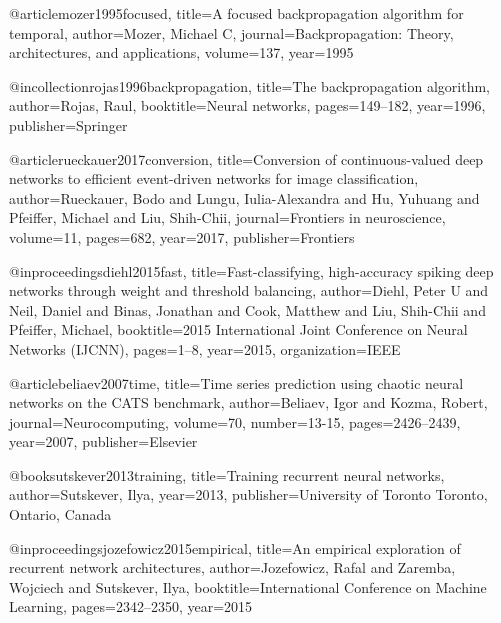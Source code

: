 @article{mozer1995focused,
  title={A focused backpropagation algorithm for temporal},
  author={Mozer, Michael C},
  journal={Backpropagation: Theory, architectures, and applications},
  volume={137},
  year={1995}
}

@incollection{rojas1996backpropagation,
  title={The backpropagation algorithm},
  author={Rojas, Raul},
  booktitle={Neural networks},
  pages={149--182},
  year={1996},
  publisher={Springer}
}

@article{rueckauer2017conversion,
  title={Conversion of continuous-valued deep networks to efficient event-driven networks for image classification},
  author={Rueckauer, Bodo and Lungu, Iulia-Alexandra and Hu, Yuhuang and Pfeiffer, Michael and Liu, Shih-Chii},
  journal={Frontiers in neuroscience},
  volume={11},
  pages={682},
  year={2017},
  publisher={Frontiers}
}

@inproceedings{diehl2015fast,
  title={Fast-classifying, high-accuracy spiking deep networks through weight and threshold balancing},
  author={Diehl, Peter U and Neil, Daniel and Binas, Jonathan and Cook, Matthew and Liu, Shih-Chii and Pfeiffer, Michael},
  booktitle={2015 International Joint Conference on Neural Networks (IJCNN)},
  pages={1--8},
  year={2015},
  organization={IEEE}
}

@article{beliaev2007time,
  title={Time series prediction using chaotic neural networks on the CATS benchmark},
  author={Beliaev, Igor and Kozma, Robert},
  journal={Neurocomputing},
  volume={70},
  number={13-15},
  pages={2426--2439},
  year={2007},
  publisher={Elsevier}
}


@book{sutskever2013training,
  title={Training recurrent neural networks},
  author={Sutskever, Ilya},
  year={2013},
  publisher={University of Toronto Toronto, Ontario, Canada}
}

@inproceedings{jozefowicz2015empirical,
  title={An empirical exploration of recurrent network architectures},
  author={Jozefowicz, Rafal and Zaremba, Wojciech and Sutskever, Ilya},
  booktitle={International Conference on Machine Learning},
  pages={2342--2350},
  year={2015}
}
